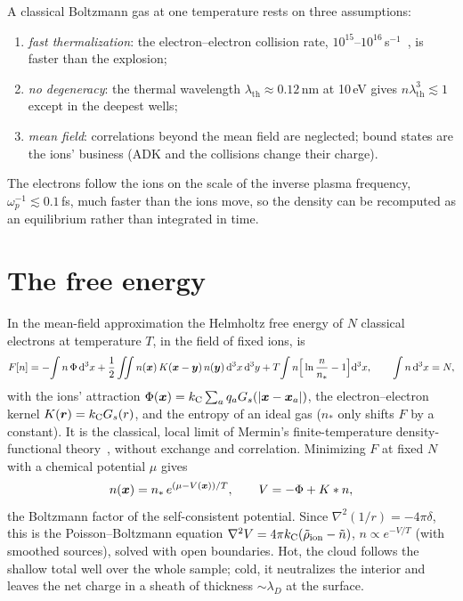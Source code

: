 A classical Boltzmann gas at one temperature rests on three assumptions:
\begin{enumerate}
  \item \emph{fast thermalization}: the electron--electron collision rate, $10^{15}$--$10^{16}$\,s$^{-1}$~\cite{nrl}, is
    faster than the explosion;
  \item \emph{no degeneracy}: the thermal wavelength $\lambda_{\mathrm{th}}\approx0.12$\,nm at 10\,eV gives
    $n\lambda_{\mathrm{th}}^3\lesssim1$ except in the deepest wells;
  \item \emph{mean field}: correlations beyond the mean field are neglected; bound states are the ions'
    business (ADK and the collisions change their charge).
\end{enumerate}
The electrons follow the ions on the scale of the inverse plasma frequency, $\omega_p^{-1}\lesssim0.1$\,fs, much
faster than the ions move, so the density can be recomputed as an equilibrium rather than integrated in time.

\section{The free energy}

In the mean-field approximation the Helmholtz free energy of $N$ classical electrons at temperature $T$, in the field
of fixed ions, is
\begin{equation}
  F[n] = -\!\int n\,\Phi\,\mathrm{d}^3x
        + \frac12\iint n(\bm{x})\,K(\bm{x}-\bm{y})\,n(\bm{y})\,\mathrm{d}^3x\,\mathrm{d}^3y
        + T\!\int n\Big[\ln\frac{n}{n_\ast}-1\Big]\mathrm{d}^3x,\qquad \int n\,\mathrm{d}^3x = N,
  \label{eq:F}
\end{equation}
with the ions' attraction $\Phi(\bm{x}) = k_{\mathrm C}\sum_a q_a G_s(|\bm{x}-\bm{x}_a|)$, the electron--electron kernel
$K(\bm{r}) = k_{\mathrm C} G_s(r)$, and the entropy of an ideal gas ($n_\ast$ only shifts $F$ by a constant).
It is the classical, local limit of Mermin's finite-temperature density-functional theory~\cite{mermin1965}, without
exchange and correlation.
Minimizing $F$ at fixed $N$ with a chemical potential $\mu$ gives
\begin{equation}
  n(\bm{x}) = n_\ast\,e^{(\mu - V(\bm{x}))/T},\qquad V = -\Phi + K*n,
  \label{eq:boltzmann}
\end{equation}
the Boltzmann factor of the self-consistent potential.
Since $\nabla^2(1/r) = -4\pi\delta$, this is the Poisson--Boltzmann equation
$\nabla^2V = 4\pi k_{\mathrm C}(\tilde\rho_{\mathrm{ion}}-\tilde n)$, $n\propto e^{-V/T}$ (with smoothed sources), solved with
open boundaries.
Hot, the cloud follows the shallow total well over the whole sample; cold, it neutralizes the interior and leaves the
net charge in a sheath of thickness $\sim\lambda_D$ at the surface.


